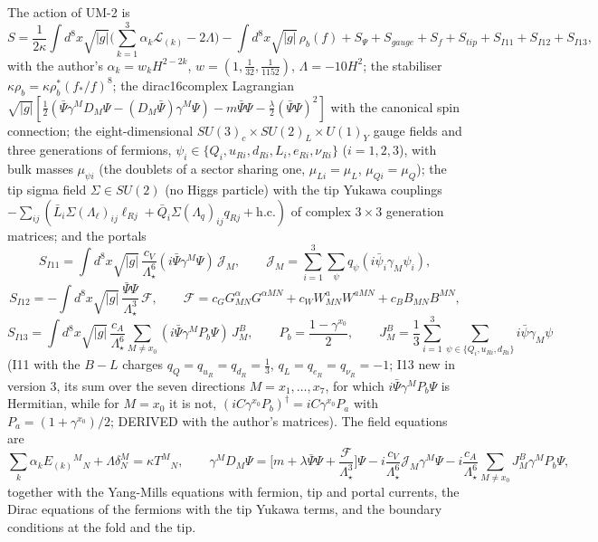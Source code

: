 \documentclass[
  10pt,
]{article}
\begin{document}
The action of UM-2 is
\[ S = \frac{1}{2\kappa}\int d^8x\sqrt{\lvert g\rvert}\Big(\sum_{k=1}^3\alpha_k\mathcal L_{(k)} - 2\Lambda\Big) - \int d^8x\sqrt{\lvert g\rvert}\,\rho_b(f) + S_\Psi + S_{gauge} + S_f + S_{tip} + S_{I11} + S_{I12} + S_{I13},\]
with the author's \(\alpha_k = w_kH^{2-2k}\),
\(w = (1, \frac1{32}, \frac1{1152})\), \(\Lambda = -10H^2\); the
stabiliser \(\kappa\rho_b = \kappa\rho_b^*(f_*/f)^8\); the
dirac16complex Lagrangian
\(\sqrt{\lvert g\rvert}[\frac12(\bar\Psi\gamma^MD_M\Psi - (D_M\bar\Psi)\gamma^M\Psi) - m\bar\Psi\Psi - \frac{\lambda}{2}(\bar\Psi\Psi)^2]\)
with the canonical spin connection; the eight-dimensional
\(SU(3)_c\times SU(2)_L\times U(1)_Y\) gauge fields and three
generations of fermions,
\(\psi_i \in \{Q_i, u_{Ri}, d_{Ri}, L_i, e_{Ri}, \nu_{Ri}\}\)
(\(i = 1, 2, 3\)), with bulk masses \(\mu_{\psi i}\) (the doublets of a
sector sharing one, \(\mu_{Li} = \mu_L\), \(\mu_{Qi} = \mu_Q\)); the tip
sigma field \(\Sigma \in SU(2)\) (no Higgs particle) with the tip Yukawa
couplings
\(-\sum_{ij}(\bar L_i\Sigma(\Lambda_\ell)_{ij}\ell_{Rj} + \bar Q_i\Sigma(\Lambda_q)_{ij}q_{Rj} + \text{h.c.})\)
of complex \(3\times3\) generation matrices; and the portals
\[ S_{I11} = \int d^8x\sqrt{\lvert g\rvert}\,\frac{c_V}{\Lambda_\star^6}(i\bar\Psi\gamma^M\Psi)\,\mathcal J_M,\qquad \mathcal J_M = \sum_{i=1}^3\sum_\psi q_\psi(i\bar\psi_i\gamma_M\psi_i),\]
\[ S_{I12} = -\int d^8x\sqrt{\lvert g\rvert}\,\frac{\bar\Psi\Psi}{\Lambda_\star^3}\,\mathcal F,\qquad \mathcal F = c_GG^\alpha_{MN}G^{\alpha MN} + c_WW^a_{MN}W^{aMN} + c_BB_{MN}B^{MN},\]
\[ S_{I13} = \int d^8x\sqrt{\lvert g\rvert}\,\frac{c_A}{\Lambda_\star^6}\sum_{M \ne x_0}(i\bar\Psi\gamma^MP_b\Psi)\,J^B_M,\qquad P_b = \frac{1 - \gamma^{x_0}}{2},\qquad J^B_M = \frac13\sum_{i=1}^3\sum_{\psi\in\{Q_i, u_{Ri}, d_{Ri}\}}i\bar\psi\gamma_M\psi\]
(I11 with the \(B - L\) charges \(q_Q = q_{u_R} = q_{d_R} = \frac13\),
\(q_L = q_{e_R} = q_{\nu_R} = -1\); I13 new in version 3, its sum over
the seven directions \(M = x_1, \dots, x_7\), for which
\(i\bar\Psi\gamma^MP_b\Psi\) is Hermitian, while for \(M = x_0\) it is
not, \((iC\gamma^{x_0}P_b)^\dagger = iC\gamma^{x_0}P_a\) with
\(P_a = (1 + \gamma^{x_0})/2\); DERIVED with the author's matrices). The
field equations are
\[ \sum_k\alpha_kE_{(k)}{}^M{}_N + \Lambda\delta^M_N = \kappa T^M{}_N,\qquad
   \gamma^MD_M\Psi = \Big[m + \lambda\bar\Psi\Psi + \frac{\mathcal F}{\Lambda_\star^3}\Big]\Psi - i\frac{c_V}{\Lambda_\star^6}\mathcal J_M\gamma^M\Psi - i\frac{c_A}{\Lambda_\star^6}\sum_{M \ne x_0}J^B_M\gamma^MP_b\Psi ,\]
together with the Yang-Mills equations with fermion, tip and portal
currents, the Dirac equations of the fermions with the tip Yukawa terms,
and the boundary conditions at the fold and the tip.
\end{document}
